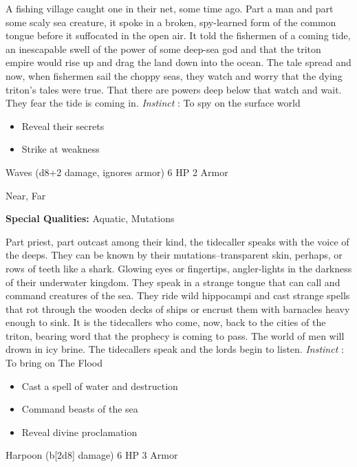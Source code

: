  A fishing village caught one in their net, some time ago. Part a man and part some scaly sea creature, it spoke in a broken, spy-learned form of the common tongue before it suffocated in the open air. It told the fishermen of a coming tide, an inescapable swell of the power of some deep-sea god and that the triton empire would rise up and drag the land down into the ocean. The tale spread and now, when fishermen sail the choppy seas, they watch and worry that the dying triton's tales were true. That there are powers deep below that watch and wait. They fear the tide is coming in. \emph{Instinct}
: To spy on the surface world
\begin{itemize}
\item Reveal their secrets
\item Strike at weakness

\end{itemize}




 Waves (d8+2 damage, ignores armor) 6 HP 2 Armor


 Near, Far


 \textbf{Special Qualities:}
 Aquatic, Mutations


 Part priest, part outcast among their kind, the tidecaller speaks with the voice of the deeps. They can be known by their mutations--transparent skin, perhaps, or rows of teeth like a shark. Glowing eyes or fingertips, angler-lights in the darkness of their underwater kingdom. They speak in a strange tongue that can call and command creatures of the sea. They ride wild hippocampi and cast strange spells that rot through the wooden decks of ships or encrust them with barnacles heavy enough to sink. It is the tidecallers who come, now, back to the cities of the triton, bearing word that the prophecy is coming to pass. The world of men will drown in icy brine. The tidecallers speak and the lords begin to listen. \emph{Instinct}
: To bring on The Flood
\begin{itemize}
\item Cast a spell of water and destruction
\item Command beasts of the sea
\item Reveal divine proclamation

\end{itemize}




 Harpoon (b[2d8] damage) 6 HP 3 Armor


